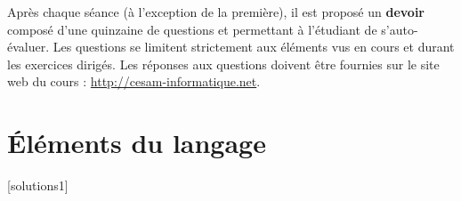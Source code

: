 \documentclass[11pt]{report}
\makeatletter
\renewcommand\part{%
  \if@openright
  \cleardoublepage
  \else
  \clearpage
  \fi
  \thispagestyle{empty}%
  \if@twocolumn
  \onecolumn
  \@tempswatrue
  \else
  \@tempswafalse
  \fi
  \null\vfil
  \secdef\@part\@spart}
\theoremstyle{definition}
\makeatother
\begin{document}
Après chaque séance (à l'exception de la première), il est proposé un
\textbf{devoir} composé d'une quinzaine de questions et permettant à
l'étudiant de s'auto-évaluer. Les questions se limitent strictement aux
éléments vus en cours et durant les exercices dirigés. Les réponses aux
questions doivent être fournies sur le site web du cours :
\url{http://cesam-informatique.net}. 

\cleardoublepage



\chapter{Éléments du langage}\label{chap:langage}
[solutions1]
\end{document}
